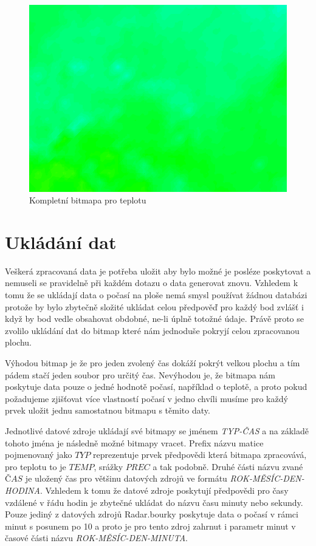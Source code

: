 \documentclass[czech,bachelor,dept460,male,csharp,cpdeclaration]{diploma}
\begin{document}
	\begin{figure}
		\centering
		\includegraphics[scale=0.5]{Data/bmp_vybarvena.png}
		\caption{Kompletní bitmapa pro teplotu}
	\end{figure}
	
	\section{Ukládání dat}
	
	Veškerá zpracovaná data je potřeba uložit aby bylo možné je posléze poskytovat a nemuseli se pravidelně při každém dotazu o data generovat znovu. Vzhledem k tomu že se ukládají data o počasí na ploše nemá smysl používat žádnou databázi protože by bylo zbytečně složité ukládat celou předpověď pro každý bod zvlášť i když by bod vedle obsahovat obdobné, ne-li úplně totožné údaje. Právě proto se zvolilo ukládání dat do bitmap které nám jednoduše pokryjí celou zpracovanou plochu.
	
	Výhodou bitmap je že pro jeden zvolený čas dokáží pokrýt velkou plochu a tím pádem stačí jeden soubor pro určitý čas. Nevýhodou je, že bitmapa nám poskytuje data pouze o jedné hodnotě počasí, například o teplotě, a proto pokud požadujeme zjišťovat více vlastností počasí v jedno chvíli musíme pro každý prvek uložit jednu samostatnou bitmapu s těmito daty.
	
	Jednotlivé datové zdroje ukládají své bitmapy se jménem {\it TYP-ČAS} a na základě tohoto jména je následně možné bitmapy vracet. Prefix názvu matice pojmenovaný jako $TYP$ reprezentuje prvek předpovědi která bitmapa zpracovává, pro teplotu to je $TEMP$, srážky $PREC$ a tak podobně. Druhé části názvu zvané $ČAS$ je uložený čas pro většinu datových zdrojů ve formátu {\it ROK-MĚSÍC-DEN-HODINA}. Vzhledem k tomu že datové zdroje poskytují předpovědi pro časy vzdálené v řádu hodin je zbytečné ukládat do názvu času minuty nebo sekundy. Pouze jediný z datových zdrojů Radar.bourky poskytuje data o počasí v rámci minut s posunem po 10 a proto je pro tento zdroj zahrnut i parametr minut v časové části názvu {\it ROK-MĚSÍC-DEN-MINUTA}.
	
\end{document}
